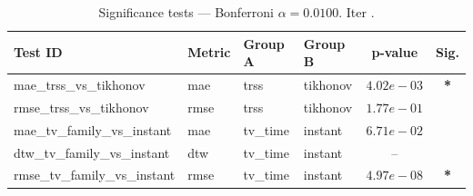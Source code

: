 ﻿%
\begin{table}[ht]
\centering
\caption[EEG reconstruction - Iteration it13]{Significance tests — Bonferroni $\alpha=0.0100$. Iter .}
\label{tab:sig_it13_gaussian_aew_3syn}
\small
\begin{tabular}{llllcc}
\toprule
Test ID & Metric & Group A & Group B & p-value & Sig. \\
\midrule
mae\_trss\_vs\_tikhonov & mae & trss & tikhonov & $4.02e-03$ & \textbf{*} \\
rmse\_trss\_vs\_tikhonov & rmse & trss & tikhonov & $1.77e-01$ &  \\
mae\_tv\_family\_vs\_instant & mae & tv\_time & instant & $6.71e-02$ &  \\
dtw\_tv\_family\_vs\_instant & dtw & tv\_time & instant & -- &  \\
rmse\_tv\_family\_vs\_instant & rmse & tv\_time & instant & $4.97e-08$ & \textbf{*} \\
\bottomrule
\end{tabular}
\end{table}







